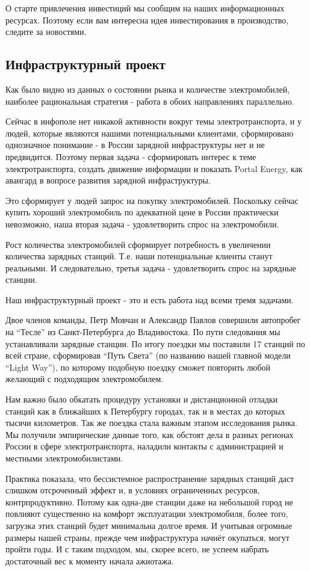 \documentclass[a4paper,12pt]{report}
\begin{document}
О старте привлечения инвестиций мы сообщим на наших информационных ресурсах. Поэтому если вам интересна идея инвестирования в производство, следите за новостями. 

\subsection{Инфраструктурный проект}

Как было видно из данных о состоянии рынка и количестве электромобилей, наиболее рациональная стратегия - работа в обоих направлениях параллельно.

Сейчас в инфополе нет никакой активности вокруг темы электротранспорта, и у людей, которые являются нашими потенциальными клиентами, сформировано однозначное понимание - в России зарядной инфраструктуры нет и не предвидится. Поэтому первая задача - сформировать интерес к теме электротранспорта, создать движение информации и показать Portal Energy, как авангард в вопросе развития зарядной инфраструктуры.

Это сформирует у людей запрос на покупку электромобилей. Поскольку сейчас купить хороший электромобиль по адекватной цене в России практически невозможно, наша вторая задача - удовлетворить спрос на электромобили. 

Рост количества электромобилей сформирует потребность в увеличении количества зарядных станций. Т.е. наши потенциальные клиенты станут реальными. И следовательно, третья задача - удовлетворить спрос на зарядные станции.

Наш инфраструктурный проект - это и есть работа над всеми тремя задачами. 

Двое членов команды, Петр Мовчан и Александр Павлов совершили автопробег на “Тесле” из Санкт-Петербурга до Владивостока. По пути следования мы устанавливали зарядные станции. По итогу поездки мы поставили 17 станций по всей стране, сформировав “Путь Света” (по названию нашей главной модели “Light Way”), по которому подобную поездку сможет повторить любой желающий с подходящим электромобилем. 

Нам важно было обкатать процедуру установки и дистанционной отладки станций как в ближайших к Петербургу городах, так и в местах до которых тысячи километров. Так же поездка стала важным этапом исследования рынка. Мы получили эмпирические данные того, как обстоят дела в разных регионах России в сфере электротранспорта, наладили контакты с администрацией и местными электромобилистами. 

Практика показала, что бессистемное распространение зарядных станций даст слишком отсроченный эффект и, в условиях ограниченных ресурсов, контрпродуктивно. Потому как одна-две станции даже на небольшой город не повлияют существенно на комфорт эксплуатации электромобиля, более того, загрузка этих станций будет минимальна долгое время. И учитывая огромные размеры нашей страны, прежде чем инфраструктура начнёт окупаться, могут пройти годы. И с таким подходом, мы, скорее всего, не успеем набрать достаточный вес к моменту начала ажиотажа. 
\end{document}
